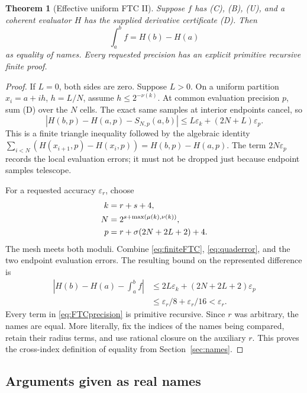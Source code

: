 \documentclass[11pt]{article}
\newtheorem{theorem}{Theorem}[section]
\theoremstyle{definition}
\newcommand{\eps}{\varepsilon}
\newcommand{\abs}[1]{\left|#1\right|}
\begin{document}
\begin{theorem}[Effective uniform FTC II]\label{thm:ftc2}
Suppose \(f\) has (C), (B), (U), and a coherent evaluator \(H\) has
the supplied derivative certificate (D).  Then
\[
 \int_a^b f=H(b)-H(a)
\]
as equality of names.  Every requested precision has an explicit
primitive recursive finite proof.
\end{theorem}
\begin{proof}
If \(L=0\), both sides are zero.  Suppose \(L>0\).  On a uniform
partition \(x_i=a+ih\), \(h=L/N\), assume
\(h\le2^{-\nu(k)}\).  At common evaluation precision \(p\), sum (D)
over the \(N\) cells.  The exact same samples at interior endpoints
cancel, so
\begin{equation}
 \abs{H(b,p)-H(a,p)-S_{N,p}(a,b)}
 \le L\eps_k+(2N+L)\eps_p.\label{eq:finiteFTC}
\end{equation}
This is a finite triangle inequality followed by the algebraic identity
\(\sum_{i<N}(H(x_{i+1},p)-H(x_i,p))=H(b,p)-H(a,p)\).
The term \(2N\eps_p\) records the local evaluation errors; it must
not be dropped just because endpoint samples telescope.

For a requested accuracy \(\eps_r\), choose
\begin{align}
 k&=r+s+4,\notag\\
 N&=2^{s+\max(\mu(k),\nu(k))},\notag\\
 p&=r+\sigma(2N+2L+2)+4.\label{eq:FTCprecision}
\end{align}
The mesh meets both moduli.  Combine \eqref{eq:finiteFTC},
\eqref{eq:quaderror}, and the two endpoint evaluation errors.  The
resulting bound on the represented difference is
\begin{align*}
 \abs{H(b)-H(a)-\int_a^b f}
 &\le 2L\eps_k+(2N+2L+2)\eps_p\\
 &\le\eps_r/8+\eps_r/16<\eps_r.
\end{align*}
Every term in \eqref{eq:FTCprecision} is primitive recursive.  Since
\(r\) was arbitrary, the names are equal.  More literally, fix the
indices of the names being compared, retain their radius terms, and
use rational closure on the auxiliary \(r\).  This proves the
cross-index definition of equality from Section~\ref{sec:names}.
\end{proof}

\subsection{Arguments given as real names}
\end{document}
